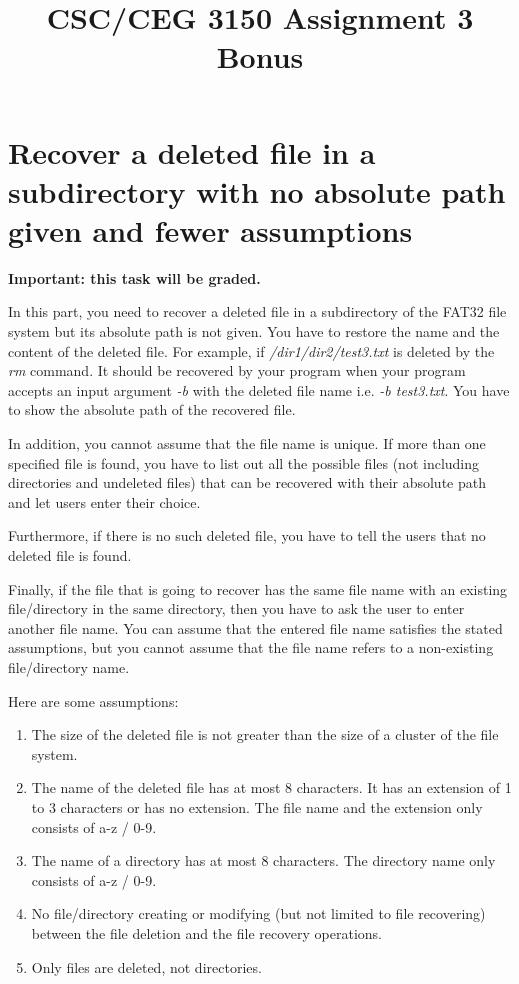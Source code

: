 \documentclass[a4paper,12pt]{article}
\title{{\bf CSC/CEG 3150 Assignment 3 Bonus}}
\author{}
\date{}
\begin{document}
\maketitle


\section*{Recover a deleted file in a subdirectory with no absolute path given and fewer assumptions}

\textbf{Important: this task will be graded.}

In this part, you need to recover a deleted file in a subdirectory of the FAT32 file system but its absolute path is not given. You have to restore the name and the content of the deleted file. For example, if \textit{/dir1/dir2/test3.txt} is deleted by the \textit{rm} command. It should be recovered by your program when your program accepts an input argument \textit{-b} with the deleted file name i.e. \textit{-b test3.txt}. You have to show the absolute path of the recovered file.

In addition, you cannot assume that the file name is unique. If more than one specified file is found, you have to list out all the possible files (not including directories and undeleted files) that can be recovered with their absolute path and let users enter their choice.

Furthermore, if there is no such deleted file, you have to tell the users that no deleted file is found.

Finally, if the file that is going to recover has the same file name with an existing file/directory in the same directory, then you have to ask the user to enter another file name. You can assume that the entered file name satisfies the stated assumptions, but you cannot assume that the file name refers to a non-existing file/directory name.

Here are some assumptions:
\begin{enumerate}
  \addtolength{\itemsep}{-4mm}
    \item The size of the deleted file is not greater than the size of a cluster of the file system.
    \item The name of the deleted file has at most 8 characters. It has an extension of 1 to 3 characters or has no extension. The file name and the extension only consists of a-z / 0-9.
    \item The name of a directory has at most 8 characters.
        The directory name only consists of a-z / 0-9.
    \item No file/directory creating or modifying (but not limited to file recovering) between the file deletion and the file recovery operations.
    \item Only files are deleted, not directories.
\end{enumerate}
\end{document}
